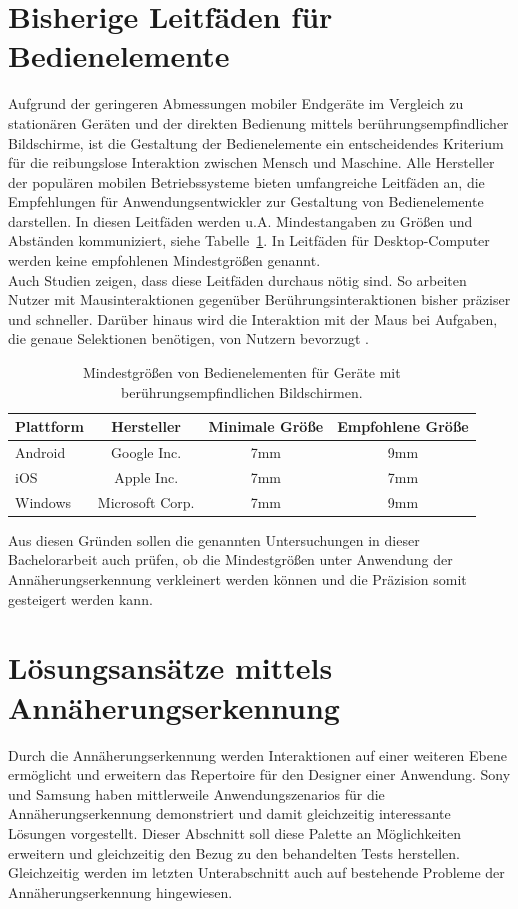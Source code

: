 \documentclass[12pt,numbers=noenddot,parskip,bibliography=totocnumbered,listof=totocnumbered]{scrreprt}
\begin{document}
\section{Bisherige Leitfäden für Bedienelemente}
Aufgrund der geringeren Abmessungen mobiler Endgeräte im Vergleich zu stationären Geräten und der direkten Bedienung mittels berührungsempfindlicher Bildschirme, ist die Gestaltung der Bedienelemente ein entscheidendes Kriterium für die reibungslose Interaktion zwischen Mensch und Maschine. Alle Hersteller der populären mobilen Betriebssysteme bieten umfangreiche Leitfäden an, die Empfehlungen für Anwendungsentwickler zur Gestaltung von Bedienelemente darstellen. In diesen Leitfäden werden u.A. Mindestangaben zu Größen und Abständen kommuniziert, siehe Tabelle~\ref{leitfadenalle}. In Leitfäden für Desktop-Computer werden keine empfohlenen Mindestgrößen genannt.\\
Auch Studien zeigen, dass diese Leitfäden durchaus nötig sind. So arbeiten Nutzer mit Mausinteraktionen gegenüber Berührungsinteraktionen bisher präziser und schneller. Darüber hinaus wird die Interaktion mit der Maus bei Aufgaben, die genaue Selektionen benötigen, von Nutzern bevorzugt \citep{touchmouse}.
\begin{table}
\centering
\renewcommand{\arraystretch}{2}
\setlength{\tabcolsep}{12pt}
\begin{tabular}{ l c c c }
Plattform & Hersteller & Minimale Größe & Empfohlene Größe\\\hline
Android \citep{androidrichtlinien} & Google Inc. & 7mm & 9mm\\
iOS \citep{applerichtlinien} & Apple Inc. & 7mm & 7mm\\
Windows \citep{winrichtlinien} & Microsoft Corp. & 7mm & 9mm\\
\end{tabular}
\caption{Mindestgrößen von Bedienelementen für Geräte mit berührungsempfindlichen Bildschirmen.}
\label{leitfadenalle}
\end{table}
Aus diesen Gründen sollen die genannten Untersuchungen in dieser Bachelorarbeit auch prüfen, ob die Mindestgrößen unter Anwendung der Annäherungserkennung verkleinert werden können und die Präzision somit gesteigert werden kann.

\section{Lösungsansätze mittels Annäherungserkennung}
Durch die Annäherungserkennung werden Interaktionen auf einer weiteren Ebene ermöglicht und erweitern das Repertoire für den Designer einer Anwendung. Sony und Samsung haben mittlerweile Anwendungszenarios für die Annäherungserkennung demonstriert und damit gleichzeitig interessante Lösungen vorgestellt. Dieser Abschnitt soll diese Palette an Möglichkeiten erweitern und gleichzeitig den Bezug zu den behandelten Tests herstellen. Gleichzeitig werden im letzten Unterabschnitt auch auf bestehende Probleme der Annäherungserkennung hingewiesen.
\end{document}
